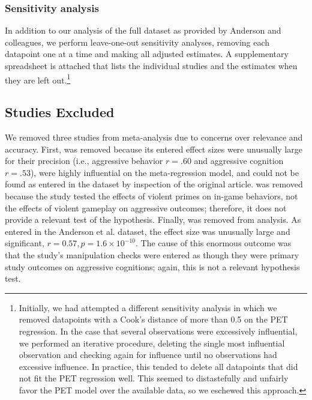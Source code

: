 \documentclass[man, mask]{apa6}
\begin{document}
\subsubsection{Sensitivity analysis}
In addition to our analysis of the full dataset as provided by Anderson and colleagues, we perform leave-one-out sensitivity analyses, removing each datapoint one at a time and making all adjusted estimates. A supplementary spreadsheet is attached that lists the individual studies and the estimates when they are left out.\footnote{Initially, we had attempted a different sensitivity analysis in which we removed datapoints with a Cook's distance of more than 0.5 on the PET regression. In the case that several observations were excessively influential, we performed an iterative procedure, deleting the single most influential observation and checking again for influence until no observations had excessive influence. In practice, this tended to delete all datapoints that did not fit the PET regression well. This seemed to distastefully and unfairly favor the PET model over the available data, so we eschewed this approach.}

\subsection{Studies Excluded}
We removed three studies from meta-analysis due to concerns over relevance and accuracy. First, \citet[study 1]{Matsuzaki:etal:2004} was removed because its entered effect sizes were unusually large for their precision (i.e., aggressive behavior $r = .60$ and aggressive cognition $r = .53$), were highly influential on the meta-regression model, and could not be found as entered in the \citet{Anderson:etal:2010} dataset by inspection of the original article. %
\citet{Panee:Ballard:2002} was removed because the study tested the effects of violent primes on in-game behaviors, not the effects of violent gameplay on aggressive outcomes; therefore, it does not provide a relevant test of the hypothesis. 
Finally, \citet{Graybill:etal:1985} was removed from analysis. As entered in the Anderson et al. dataset, the effect size was unusually large and significant, $r = 0.57, p = 1.6 \times 10^{-10}$. The cause of this enormous outcome was that the study's manipulation checks were entered as though they were primary study outcomes on aggressive cognitions; again, this is not a relevant hypothesis test. 
\end{document}
